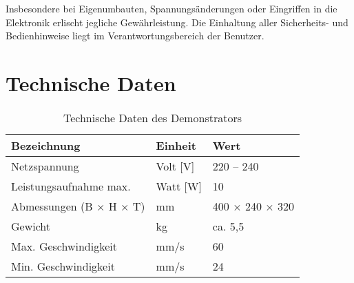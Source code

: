 \documentclass[a4paper,12pt]{report}
\begin{document}
		Insbesondere bei Eigenumbauten, Spannungsänderungen oder Eingriffen in die Elektronik erlischt jegliche Gewährleistung. Die Einhaltung aller Sicherheits- und Bedienhinweise liegt im Verantwortungsbereich der Benutzer. 

	
	
	\chapter{Technische Daten}
	\begin{table}[h]
		\centering
		\begin{tabular}{|p{5cm}|p{3cm}|p{4cm}|}
			\hline
			\textbf{Bezeichnung} & \textbf{Einheit} & \textbf{Wert} \\ \hline
			Netzspannung & Volt [V] & 220 -- 240 \\ \hline
			Leistungsaufnahme max. & Watt [W] & 10 \\ \hline
			Abmessungen (B × H × T) & mm & 400 × 240 × 320 \\ \hline
			Gewicht & kg & ca. 5{,}5 \\ \hline
			Max. Geschwindigkeit & mm/s & 60 \\ \hline
			Min. Geschwindigkeit & mm/s & 24 \\ \hline
		\end{tabular}
		\caption{Technische Daten des Demonstrators}
		\label{tab:technische_daten}
	\end{table}
	
	
\end{document}
